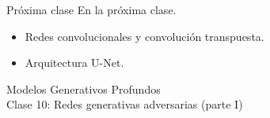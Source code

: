 \documentclass{beamer}
\begin{document}
\begin{frame}{Próxima clase}
    En la próxima clase.
    \begin{itemize}
        \item Redes convolucionales y convolución transpuesta.
        \item Arquitectura U-Net.
    \end{itemize}
\end{frame}

\begin{frame}
    \centering
    \Large{Modelos Generativos Profundos}\\
    \large{Clase 10: Redes generativas adversarias (parte I)}
\end{frame}
\end{document}
